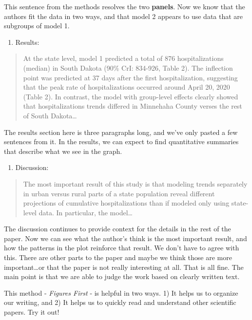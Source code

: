 \documentclass[
]{article}
\providecommand{\tightlist}{%
  \setlength{\itemsep}{0pt}\setlength{\parskip}{0pt}}
\begin{document}
This sentence from the methods resolves the two \textbf{panels}. Now we
know that the authors fit the data in two ways, and that model 2 appears
to use data that are subgroups of model 1.

\begin{enumerate}
\def\labelenumi{\arabic{enumi}.}
\setcounter{enumi}{4}
\tightlist
\item
  Results:
\end{enumerate}

\begin{quote}
At the state level, model 1 predicted a total of 876 hospitalizations
(median) in South Dakota (90\% CrI: 834-926, Table 2). The inflection
point was predicted at 37 days after the first hospitalization,
suggesting that the peak rate of hospitalizations occurred around April
20, 2020 (Table 2). In contrast, the model with group-level effects
clearly showed that hospitalizations trends differed in Minnehaha County
verses the rest of South Dakota\ldots{}
\end{quote}

The results section here is three paragraphs long, and we've only pasted
a few sentences from it. In the results, we can expect to find
quantitative summaries that describe what we see in the graph.

\begin{enumerate}
\def\labelenumi{\arabic{enumi}.}
\setcounter{enumi}{5}
\tightlist
\item
  Discussion:
\end{enumerate}

\begin{quote}
The most important result of this study is that modeling trends
separately in urban versus rural parts of a state population reveal
different projections of cumulative hospitalizations than if modeled
only using state-level data. In particular, the model\ldots{}
\end{quote}

The discussion continues to provide context for the details in the rest
of the paper. Now we can see what the author's think is the most
important result, and how the patterns in the plot reinforce that
result. We don't have to agree with this. There are other parts to the
paper and maybe we think those are more important\ldots or that the
paper is not really interesting at all. That is all fine. The main point
is that we are able to judge the work based on clearly written text.

This method - \emph{Figures First} - is helpful in two ways. 1) It helps
us to organize our writing, and 2) It helps us to quickly read and
understand other scientific papers. Try it out!
\end{document}
